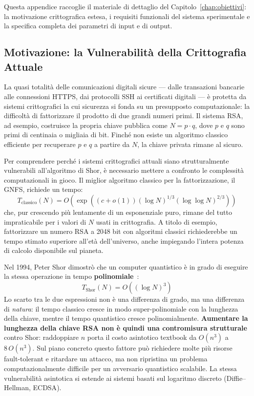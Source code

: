 \begin{onehalfspace}

Questa appendice raccoglie il materiale di dettaglio del Capitolo~\ref{chap:obiettivi}: la motivazione crittografica estesa, i requisiti funzionali del sistema sperimentale e la specifica completa dei parametri di input e di output.

\subsection{Motivazione: la Vulnerabilità della Crittografia Attuale}
\label{sec:motivazione}

La quasi totalità delle comunicazioni digitali sicure --- dalle transazioni bancarie alle connessioni \ac{HTTPS}, dai protocolli \ac{SSH} ai certificati digitali --- è protetta da sistemi crittografici la cui sicurezza si fonda su un presupposto computazionale: la difficoltà di fattorizzare il prodotto di due grandi numeri primi. Il sistema \ac{RSA}, ad esempio, costruisce la propria chiave pubblica come $N = p \cdot q$, dove $p$ e $q$ sono primi di centinaia o migliaia di bit. Finché non esiste un algoritmo classico efficiente per recuperare $p$ e $q$ a partire da $N$, la chiave privata rimane al sicuro.

Per comprendere perché i sistemi crittografici attuali siano strutturalmente vulnerabili all'algoritmo di Shor, è necessario mettere a confronto le complessità computazionali in gioco. Il miglior algoritmo classico per la fattorizzazione, il \ac{GNFS}, richiede un tempo:
\begin{equation}
    T_{\text{classico}}(N) = O\!\left(\exp\!\left((c+o(1))(\log N)^{1/3}(\log\log N)^{2/3}\right)\right)
    \label{eq:gnfs_obiettivi}
\end{equation}
che, pur crescendo più lentamente di un esponenziale puro, rimane del tutto impraticabile per i valori di $N$ usati in crittografia. A titolo di esempio, fattorizzare un numero RSA a 2048 bit con algoritmi classici richiederebbe un tempo stimato superiore all'età dell'universo, anche impiegando l'intera potenza di calcolo disponibile sul pianeta.

Nel 1994, Peter Shor dimostrò che un computer quantistico è in grado di eseguire la stessa operazione in tempo \textbf{polinomiale}~\cite{shor1994}:
\begin{equation}
    T_{\text{Shor}}(N) = O\!\left((\log N)^3\right)
    \label{eq:shor_obiettivi}
\end{equation}
Lo scarto tra le due espressioni non è una differenza di grado, ma una differenza di \textit{natura}: il tempo classico cresce in modo super-polinomiale con la lunghezza della chiave, mentre il tempo quantistico cresce polinomialmente. \textbf{Aumentare la lunghezza della chiave RSA non è quindi una contromisura strutturale} contro Shor: raddoppiare $n$ porta il costo asintotico textbook da $O(n^3)$ a $8\,O(n^3)$. Sul piano concreto questo fattore può richiedere molte più risorse fault-tolerant e ritardare un attacco, ma non ripristina un problema computazionalmente difficile per un avversario quantistico scalabile. La stessa vulnerabilità asintotica si estende ai sistemi basati sul logaritmo discreto (Diffie--Hellman, \ac{ECDSA}).


\end{onehalfspace}
